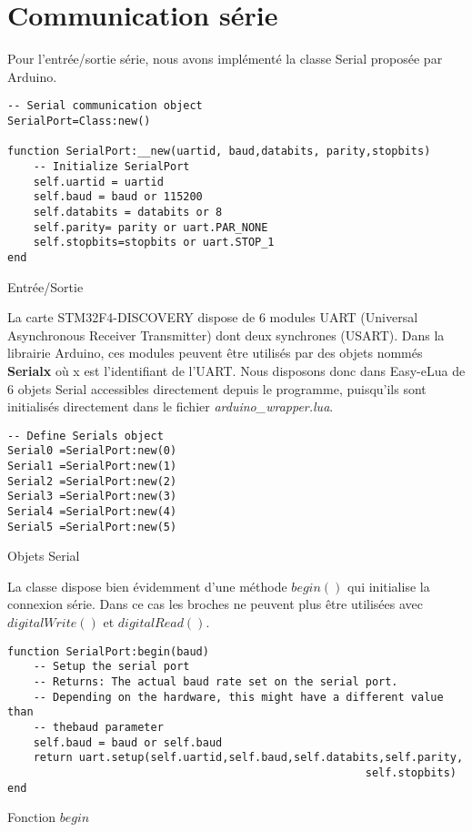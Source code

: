 \section{Communication série}

Pour l'entrée/sortie série, nous avons implémenté la classe Serial proposée par Arduino.

\begin{table}[h]
\begin{lstlisting}
-- Serial communication object
SerialPort=Class:new()

function SerialPort:__new(uartid, baud,databits, parity,stopbits)
    -- Initialize SerialPort
    self.uartid = uartid
    self.baud = baud or 115200
    self.databits = databits or 8
    self.parity= parity or uart.PAR_NONE
    self.stopbits=stopbits or uart.STOP_1
end
\end{lstlisting}
\caption{Entrée/Sortie}
\end{table}

La carte STM32F4-DISCOVERY dispose de 6 modules UART (Universal Asynchronous Receiver Transmitter) dont deux synchrones (USART).
 Dans la librairie Arduino, ces modules peuvent être utilisés par des objets nommés \textbf{Serialx} où x est l’identifiant de l’UART. 
Nous disposons donc dans Easy-eLua de 6 objets Serial accessibles directement depuis le programme, puisqu’ils sont initialisés 
directement dans le fichier \textit{arduino\_wrapper.lua}.

\begin{table}[h]
\begin{lstlisting}
-- Define Serials object
Serial0 =SerialPort:new(0)
Serial1 =SerialPort:new(1)
Serial2 =SerialPort:new(2)
Serial3 =SerialPort:new(3)
Serial4 =SerialPort:new(4)
Serial5 =SerialPort:new(5)
\end{lstlisting}
\caption{Objets Serial}
\end{table}

\newpage
La classe dispose bien évidemment d’une méthode $begin()$
qui initialise la connexion série. Dans ce cas les broches ne peuvent plus être utilisées avec $digitalWrite()$ et $digitalRead()$.

\begin{table}[h]
\begin{lstlisting}
function SerialPort:begin(baud)
    -- Setup the serial port
    -- Returns: The actual baud rate set on the serial port.
    -- Depending on the hardware, this might have a different value than
    -- thebaud parameter
    self.baud = baud or self.baud
    return uart.setup(self.uartid,self.baud,self.databits,self.parity,
                                                       self.stopbits)
end
\end{lstlisting}
\caption{Fonction $begin$}
\end{table}

